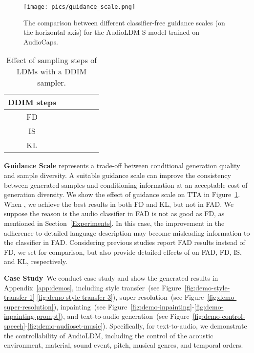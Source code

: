 \documentclass{article}
\begin{document}
\begin{figure}[tbp]
    \centering
    \texttt{[image: pics/guidance\_scale.png]}
    \caption{The comparison between different classifier-free guidance scales (on the horizontal axis) for the AudioLDM-S model trained on AudioCaps.}
    \label{fig:classifier-free-guidance}
    \vspace{-2mm}
\end{figure}

\begin{table}[tbp]
\centering
\small
\begin{tabular}{cccccc}
\toprule
DDIM steps    &     &       &      &      &    \\
\midrule
FD    &       &         &        &         &       \\
IS    &       &         &        &         & 
       \\ KL    &       &         &        &         &       \\
\bottomrule
\end{tabular}
\caption{Effect of sampling steps of LDMs with a DDIM sampler.}
\label{tab: DDIMsampling}
\vspace{-6mm}
\end{table}

\textbf{Guidance Scale} 
represents a trade-off between conditional generation quality and sample diversity. A suitable guidance scale can improve the consistency between generated samples and conditioning information at an acceptable cost of generation diversity. We show the effect of guidance scale  on TTA in Figure~\ref{fig:classifier-free-guidance}. When , we achieve the best results in both FD and KL, but not in FAD. We suppose the reason is the audio classifier in FAD is not as good as FD, as mentioned in Section~\ref{Experiments}. In this case, the improvement in the adherence to detailed language description may become misleading information to the classifier in FAD. Considering previous studies report FAD results instead of FD, we set  for comparison, but also provide detailed effects of  on FAD, FD, IS, and KL, respectively. 

\textbf{Case Study}~We conduct case study and show the generated results in Appendix~\ref{app:demos}, including style transfer~(see Figure~\ref{fig:demo-style-transfer-1}-\ref{fig:demo-style-transfer-3}), super-resolution~(see Figure~\ref{fig:demo-super-resolution}), inpainting~(see Figure~\ref{fig:demo-inpainting}-\ref{fig:demo-inpainting-prompt}), and text-to-audio generation~(see Figure~\ref{fig:demo-control-speech}-\ref{fig:demo-audioset-music}). Specifically, for text-to-audio, we demonstrate the controllability of AudioLDM, including the control of the acoustic environment, material, sound event, pitch, musical genres, and temporal orders.
\end{document}
